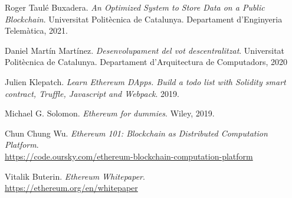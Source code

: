 \documentclass[10pt]{article}
\begin{document}
\begin{multicols}{2}
\begin{thebibliography}{100}
Roger Taulé Buxadera. 
\textit{An Optimized System to Store Data on a Public Blockchain}. 
Universitat Politècnica de Catalunya. Departament d'Enginyeria Telemàtica, 2021.

Daniel Martín Martínez. 
\textit{Desenvolupament del vot descentralitzat}. 
Universitat Politècnica de Catalunya. Departament d'Arquitectura de Computadors, 2020

Julien Klepatch. 
\textit{Learn Ethereum DApps. Build a todo list with Solidity smart contract, Truffle, Javascript and Webpack}.
2019.

Michael G. Solomon. 
\textit{Ethereum for dummies}.
Wiley, 2019.

Chun Chung Wu. 
\textit{Ethereum 101: Blockchain as Distributed Computation Platform}.
{\small \\\url{https://code.oursky.com/ethereum-blockchain-computation-platform}}

Vitalik Buterin. 
\textit{Ethereum Whitepaper}.
{\small \\\url{https://ethereum.org/en/whitepaper}}

\end{thebibliography}

\end{multicols}
\end{document}
